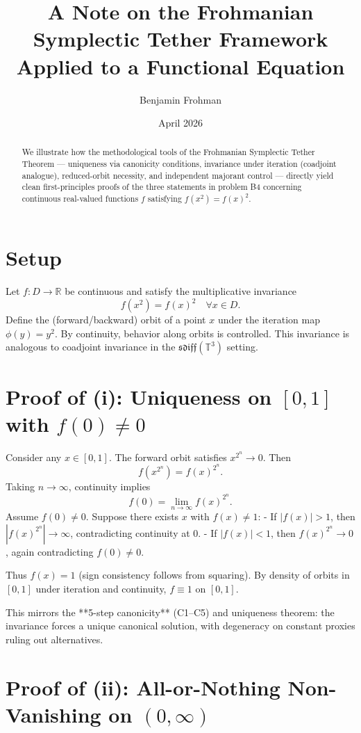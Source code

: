\documentclass[11pt,a4paper]{article}
\title{A Note on the Frohmanian Symplectic Tether Framework Applied to a Functional Equation}
\author{Benjamin Frohman}
\date{April 2026}
\begin{document}
\maketitle

\begin{abstract}
We illustrate how the methodological tools of the Frohmanian Symplectic Tether Theorem --- uniqueness via canonicity conditions, invariance under iteration (coadjoint analogue), reduced-orbit necessity, and independent majorant control --- directly yield clean first-principles proofs of the three statements in problem B4 concerning continuous real-valued functions \(f\) satisfying \(f(x^2) = f(x)^2\).
\end{abstract}

\section{Setup}
Let \(f: D \to \mathbb{R}\) be continuous and satisfy the multiplicative invariance
\[
f(x^2) = f(x)^2 \quad \forall x \in D.
\]
Define the (forward/backward) orbit of a point \(x\) under the iteration map \(\phi(y) = y^2\). By continuity, behavior along orbits is controlled. This invariance is analogous to coadjoint invariance in the \(\mathfrak{sdiff}(\mathbb{T}^3)\) setting.

\section{Proof of (i): Uniqueness on \([0,1]\) with \(f(0) \neq 0\)}

Consider any \(x \in [0,1]\). The forward orbit satisfies \(x^{2^n} \to 0\). Then
\[
f(x^{2^n}) = f(x)^{2^n}.
\]
Taking \(n \to \infty\), continuity implies
\[
f(0) = \lim_{n\to\infty} f(x)^{2^n}.
\]
Assume \(f(0) \neq 0\). Suppose there exists \(x\) with \(f(x) \neq 1\):
- If \(|f(x)| > 1\), then \(|f(x)^{2^n}| \to \infty\), contradicting continuity at 0.
- If \(|f(x)| < 1\), then \(f(x)^{2^n} \to 0\), again contradicting \(f(0) \neq 0\).

Thus \(f(x) = 1\) (sign consistency follows from squaring). By density of orbits in \([0,1]\) under iteration and continuity, \(f \equiv 1\) on \([0,1]\).

This mirrors the **5-step canonicity** (C1--C5) and uniqueness theorem: the invariance forces a unique canonical solution, with degeneracy on constant proxies ruling out alternatives.

\section{Proof of (ii): All-or-Nothing Non-Vanishing on \((0,\infty)\)}
\end{document}
